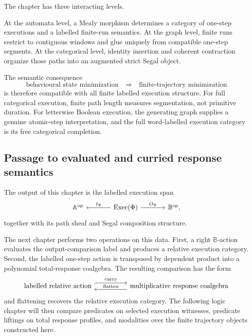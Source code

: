 \begin{remark}
\label{rem:temporal-final-conceptual-summary}
The chapter has three interacting levels.

At the automata level, a Mealy morphism determines a category of one-step
executions and a labelled finite-run semantics.  At the graph level, finite
runs restrict to contiguous windows and glue uniquely from compatible
one-step segments.  At the categorical level, identity insertion and coherent
contraction organize those paths into an augmented strict Segal object.

The semantic consequence
\[
    \text{behavioural state minimization}
    \quad\Longrightarrow\quad
    \text{finite-trajectory minimization}
\]
is therefore compatible with all finite labelled execution structure.  For
full categorical execution, finite path length measures segmentation, not
primitive duration.  For letterwise Boolean execution, the generating graph
supplies a genuine atomic-step interpretation, and the full word-labelled
execution category is its free categorical completion.
\end{remark}

\subsection{Passage to evaluated and curried response semantics}
\label{subsec:temporal-passage-response-semantics}

The output of this chapter is the labelled execution span
\[
\begin{tikzcd}[column sep=large]
    \mathbb A^{\mathrm{op}}
    &
    \operatorname{Exec}(\Phi)
        \arrow[l, "I_\Phi"']
        \arrow[r, "O_\Phi"]
    &
    \mathbb B^{\mathrm{op}},
\end{tikzcd}
\]
together with its path sheaf and Segal composition structure.

The next chapter performs two operations on this data.  First, a right
\(\mathbb B\)-action evaluates the output-comparison label and produces a
relative execution category.  Second, the labelled one-step action is
transposed by dependent product into a polynomial total-response coalgebra.
The resulting comparison has the form
\[
\begin{tikzcd}[column sep=huge]
    \text{labelled relative action}
        \arrow[r, shift left=1.1ex, "\text{curry}"]
    &
    \text{multiplicative response coalgebra}
        \arrow[l, shift left=1.1ex, "\text{flatten}"']
\end{tikzcd}
\]
and flattening recovers the relative execution category.  The following logic
chapter will then compare predicates on selected execution witnesses,
predicate liftings on total response profiles, and modalities over the finite
trajectory objects constructed here.

